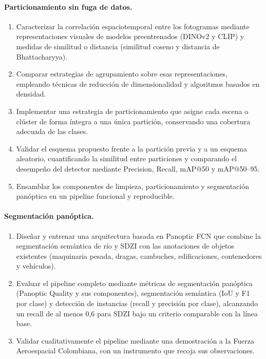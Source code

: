 \paragraph{Particionamiento sin fuga de datos.}
\begin{enumerate}
    \item Caracterizar la correlación espaciotemporal entre los fotogramas mediante representaciones visuales de modelos preentrenados (DINOv2 y CLIP) y medidas de similitud o distancia (similitud coseno y distancia de Bhattacharyya).
    \item Comparar estrategias de agrupamiento sobre esas representaciones, empleando técnicas de reducción de dimensionalidad y algoritmos basados en densidad.
    \item Implementar una estrategia de particionamiento que asigne cada escena o clúster de forma íntegra a una única partición, conservando una cobertura adecuada de las clases.
    \item Validar el esquema propuesto frente a la partición previa y a un esquema aleatorio, cuantificando la similitud entre particiones y comparando el desempeño del detector mediante Precision, Recall, mAP@50 y mAP@50--95.
    \item Ensamblar los componentes de limpieza, particionamiento y segmentación panóptica en un pipeline funcional y reproducible.
\end{enumerate}

\paragraph{Segmentación panóptica.}
\begin{enumerate}
    \item Diseñar y entrenar una arquitectura basada en Panoptic FCN que combine la segmentación semántica de río y SDZI con las anotaciones de objetos existentes (maquinaria pesada, dragas, cambuches, edificaciones, contenedores y vehículos).
    \item Evaluar el pipeline completo mediante métricas de segmentación panóptica (Panoptic Quality y sus componentes), segmentación semántica (IoU y F1 por clase) y detección de instancias (recall y precisión por clase), alcanzando un recall de al menos 0,6 para SDZI bajo un criterio comparable con la línea base.
    \item Validar cualitativamente el pipeline mediante una demostración a la Fuerza Aeroespacial Colombiana, con un instrumento que recoja sus observaciones.
\end{enumerate}
